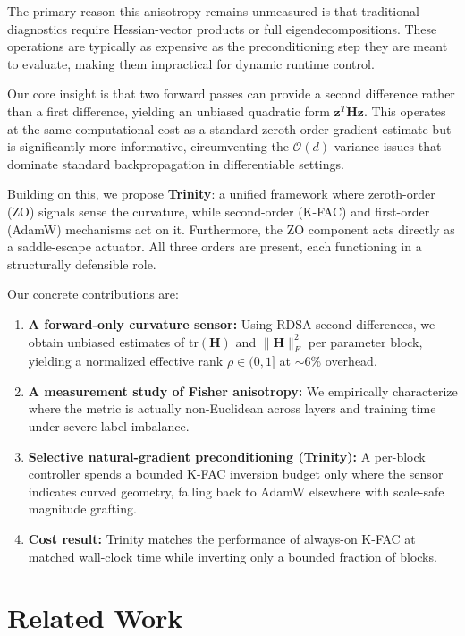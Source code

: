 \documentclass[conference]{IEEEtran}
\begin{document}
The primary reason this anisotropy remains unmeasured is that traditional diagnostics require Hessian-vector products or full eigendecompositions. These operations are typically as expensive as the preconditioning step they are meant to evaluate, making them impractical for dynamic runtime control.

Our core insight is that two forward passes can provide a second difference rather than a first difference, yielding an unbiased quadratic form $\mathbf{z}^T \mathbf{H} \mathbf{z}$. This operates at the same computational cost as a standard zeroth-order gradient estimate but is significantly more informative, circumventing the $\mathcal{O}(d)$ variance issues that dominate standard backpropagation in differentiable settings.

Building on this, we propose \textbf{Trinity}: a unified framework where zeroth-order (ZO) signals sense the curvature, while second-order (K-FAC) and first-order (AdamW) mechanisms act on it. Furthermore, the ZO component acts directly as a saddle-escape actuator. All three orders are present, each functioning in a structurally defensible role.

Our concrete contributions are:
\begin{enumerate}
    \item \textbf{A forward-only curvature sensor:} Using RDSA second differences, we obtain unbiased estimates of $\mathrm{tr}(\mathbf{H})$ and $\|\mathbf{H}\|_F^2$ per parameter block, yielding a normalized effective rank $\rho \in (0,1]$ at $\sim$6\% overhead.
    \item \textbf{A measurement study of Fisher anisotropy:} We empirically characterize where the metric is actually non-Euclidean across layers and training time under severe label imbalance.
    \item \textbf{Selective natural-gradient preconditioning (Trinity):} A per-block controller spends a bounded K-FAC inversion budget only where the sensor indicates curved geometry, falling back to AdamW elsewhere with scale-safe magnitude grafting.
    \item \textbf{Cost result:} Trinity matches the performance of always-on K-FAC at matched wall-clock time while inverting only a bounded fraction of blocks.
\end{enumerate}

\section{Related Work}
\end{document}

